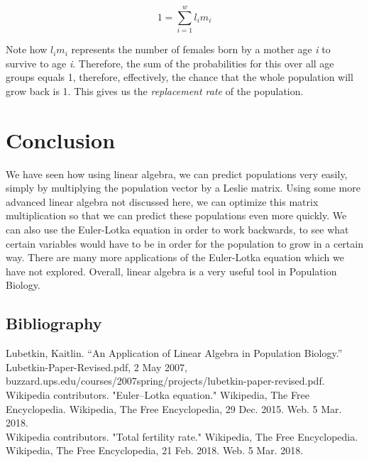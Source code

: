 \documentclass{article}
\begin{document}
\begin{equation*}
1 = \displaystyle\sum_{i=1}^{w} l_im_i
\end{equation*}

Note how $ l_im_i $ represents the number of females born by a mother age \textit{i} to survive to age \textit{i}. Therefore, the sum of the probabilities for this over all age groups equals 1, therefore, effectively, the chance that the whole population will grow back is 1. This gives us the \textit{replacement rate} of the population.

\section{Conclusion}
We have seen how using linear algebra, we can predict populations very easily, simply by multiplying the population vector by a Leslie matrix. Using some more advanced linear algebra not discussed here, we can optimize this matrix multiplication so that we can predict these populations even more quickly. We can also use the Euler-Lotka equation in order to work backwards, to see what certain variables would have to be in order for the population to grow in a certain way. There are many more applications of the Euler-Lotka equation which we have not explored. Overall, linear algebra is a very useful tool in Population Biology.

\newpage
\subsection{Bibliography}
Lubetkin, Kaitlin. “An Application of Linear Algebra in Population Biology.” Lubetkin-Paper-Revised.pdf, 2 May 2007, buzzard.ups.edu/courses/2007spring/projects/lubetkin-paper-revised.pdf. \\
Wikipedia contributors. "Euler–Lotka equation." Wikipedia, The Free Encyclopedia. Wikipedia, The Free Encyclopedia, 29 Dec. 2015. Web. 5 Mar. 2018. \\
Wikipedia contributors. "Total fertility rate." Wikipedia, The Free Encyclopedia. Wikipedia, The Free Encyclopedia, 21 Feb. 2018. Web. 5 Mar. 2018.
\end{document}
